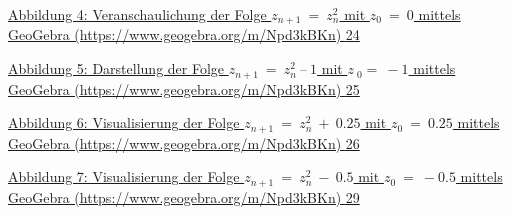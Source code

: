 \documentclass[a4paper, 12pt]{book}
\begin{document}
\protect\hyperlink{_Toc167901654}{Abbildung 4: Veranschaulichung der
Folge \(z_{n + 1}\  = \ z_{n}^{2}\) mit \(z_{0}\  = \ 0\) mittels
GeoGebra (https://www.geogebra.org/m/Npd3kBKn)
\protect\hyperlink{_Toc167901654}{24}}

\protect\hyperlink{_Toc167901655}{Abbildung 5: Darstellung der Folge
\(z_{n + 1}\  = \ z_{n}^{2}\ –\ 1\) mit \({z\ }_{0} = \  - 1\) mittels
GeoGebra (https://www.geogebra.org/m/Npd3kBKn)
\protect\hyperlink{_Toc167901655}{25}}

\protect\hyperlink{_Toc167901656}{Abbildung 6: Visualisierung der Folge
\(z_{n + 1}\  = \ z_{n}^{2}\  + \ 0.25\) mit \(z_{0}\  = \ 0.25\)
mittels GeoGebra (https://www.geogebra.org/m/Npd3kBKn)
\protect\hyperlink{_Toc167901656}{26}}

\protect\hyperlink{_Toc167901657}{Abbildung 7: Visualisierung der Folge
\(z_{n + 1}\  = \ z_{n}^{2}\  - \ 0.5\) mit \(z_{0}\  = \  - 0.5\)
mittels GeoGebra (https://www.geogebra.org/m/Npd3kBKn)
\protect\hyperlink{_Toc167901657}{29}}
\end{document}
